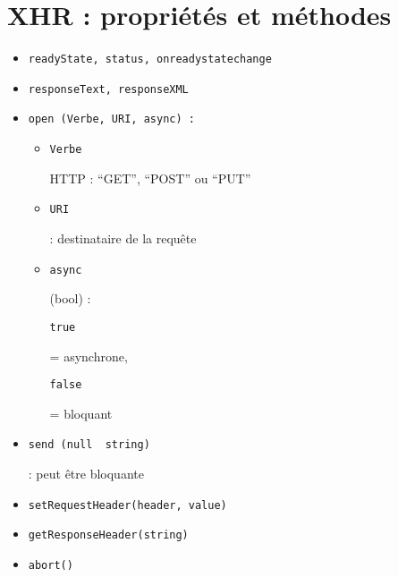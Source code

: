 \hypertarget{xhr-propriuxe9tuxe9s-et-muxe9thodes}{%
\section{XHR : propriétés et
méthodes}\label{xhr-propriuxe9tuxe9s-et-muxe9thodes}}

\begin{itemize}
\tightlist
\item
  \begin{otherlanguage}{english}\texttt{readyState,\ status,\ onreadystatechange}\end{otherlanguage}
\item
  \begin{otherlanguage}{english}\texttt{responseText,\ responseXML}\end{otherlanguage}
\item
  \begin{otherlanguage}{english}\texttt{open\ (Verbe,\ URI,\ async)\ :}\end{otherlanguage}

  \begin{itemize}
  \tightlist
  \item
    \begin{otherlanguage}{english}\texttt{Verbe}\end{otherlanguage} HTTP
    : ``GET'', ``POST'' ou ``PUT''
  \item
    \begin{otherlanguage}{english}\texttt{URI}\end{otherlanguage} :
    destinataire de la requête
  \item
    \begin{otherlanguage}{english}\texttt{async}\end{otherlanguage}
    (bool) :
    \begin{otherlanguage}{english}\texttt{true}\end{otherlanguage} =
    asynchrone,
    \begin{otherlanguage}{english}\texttt{false}\end{otherlanguage} =
    bloquant
  \end{itemize}
\item
  \begin{otherlanguage}{english}\texttt{send\ (null\ \textbar{}\ string)}\end{otherlanguage}
  : peut être bloquante
\item
  \begin{otherlanguage}{english}\texttt{setRequestHeader(header,\ value)}\end{otherlanguage}
\item
  \begin{otherlanguage}{english}\texttt{getResponseHeader(string)}\end{otherlanguage}
\item
  \begin{otherlanguage}{english}\texttt{abort()}\end{otherlanguage}
\end{itemize}

